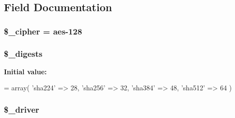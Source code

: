 \subsection{Field Documentation}
\hypertarget{class_c_i___encryption_a4e0ebc185eac8850eed1270574032c20}{}
\subsubsection[{\$\+\_\+cipher}]{\setlength{\rightskip}{0pt plus 5cm}\$\+\_\+cipher = \textquotesingle{}aes-\/128\textquotesingle{}\hspace{0.3cm}{\ttfamily [protected]}}\label{class_c_i___encryption_a4e0ebc185eac8850eed1270574032c20}
\hypertarget{class_c_i___encryption_a5f70786f3b0ed3eef6c19f433102ca66}{}
\subsubsection[{\$\+\_\+digests}]{\setlength{\rightskip}{0pt plus 5cm}\$\+\_\+digests\hspace{0.3cm}{\ttfamily [protected]}}\label{class_c_i___encryption_a5f70786f3b0ed3eef6c19f433102ca66}
{\bfseries Initial value\+:}
\begin{DoxyCode}
= array(
        \textcolor{stringliteral}{'sha224'} => 28,
        \textcolor{stringliteral}{'sha256'} => 32,
        \textcolor{stringliteral}{'sha384'} => 48,
        \textcolor{stringliteral}{'sha512'} => 64
    )
\end{DoxyCode}
\hypertarget{class_c_i___encryption_a538d24348271772aa61f8239cc6431dd}{}
\subsubsection[{\$\+\_\+driver}]{\setlength{\rightskip}{0pt plus 5cm}\$\+\_\+driver\hspace{0.3cm}{\ttfamily [protected]}}\label{class_c_i___encryption_a538d24348271772aa61f8239cc6431dd}
\hypertarget{class_c_i___encryption_a3734ce50add95d0d78ea9fff6c4ad856}{}
